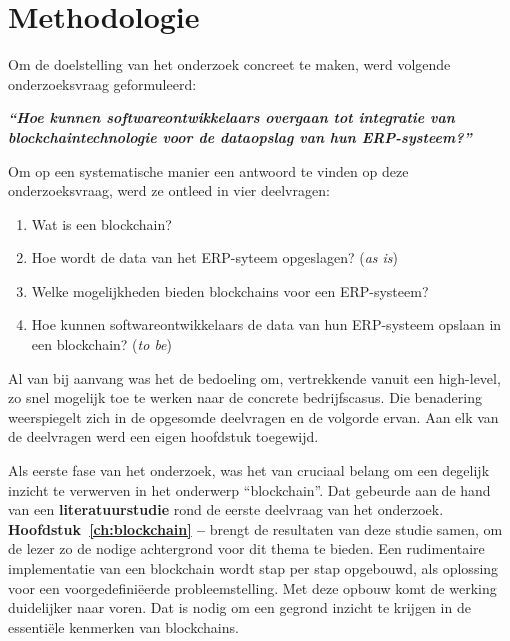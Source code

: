
\chapter{Methodologie}
\label{ch:methodologie}


Om de doelstelling van het onderzoek concreet te maken, werd volgende onderzoeksvraag geformuleerd:

\begin{center}
	\textit{\textbf{``Hoe kunnen softwareontwikkelaars overgaan tot integratie van blockchaintechnologie voor de dataopslag van hun ERP-systeem?''}}
\end{center}

Om op een systematische manier een antwoord te vinden op deze onderzoeksvraag, werd ze ontleed in vier deelvragen:

\begin{enumerate}
	\item Wat is een blockchain?
	\item Hoe wordt de data van het ERP-syteem opgeslagen? (\textit{as is})
	\item Welke mogelijkheden bieden blockchains voor een ERP-systeem?
	\item Hoe kunnen softwareontwikkelaars de data van hun ERP-systeem opslaan in een blockchain? (\textit{to be})
\end{enumerate}

Al van bij aanvang was het de bedoeling om, vertrekkende vanuit een high-level, zo snel mogelijk toe te werken naar de concrete bedrijfscasus. Die benadering weerspiegelt zich in de opgesomde deelvragen en de volgorde ervan.
Aan elk van de deelvragen werd een eigen hoofdstuk toegewijd.

Als eerste fase van het onderzoek, was het van cruciaal belang om een degelijk inzicht te verwerven in het onderwerp ``blockchain''. Dat gebeurde aan de hand van een \textbf{literatuurstudie} rond de eerste deelvraag van het onderzoek.
\textbf{Hoofdstuk~\ref{ch:blockchain} -- } brengt de resultaten van deze studie samen, om de lezer zo de nodige achtergrond voor dit thema te bieden. Een rudimentaire implementatie van een blockchain wordt stap per stap opgebouwd, als oplossing voor een voorgedefiniëerde probleemstelling. Met deze opbouw komt de werking duidelijker naar voren. Dat is nodig om een gegrond inzicht te krijgen in de essentiële kenmerken van blockchains.


